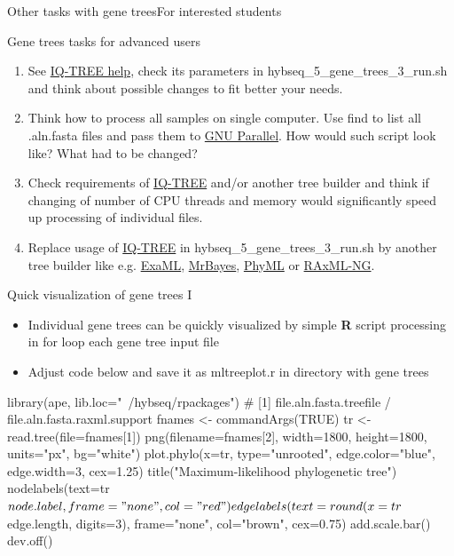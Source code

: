 \documentclass[compress,  xelatex, 11pt, xcolor=x11names, aspectratio=169,
	hyperref={
		bookmarks=true,
		unicode=true,
		colorlinks=true,
		pdftitle={HybSeq course},
		plainpages=false,
		pdfauthor={Vojtech Zeisek},
		pdfsubject={Practical processing of HybSeq target enrichment sequencing data on computing grids like MetaCentrum},
		pdfcreator={XeLaTeX},
		pdfkeywords={BASH, command line, GNU, HybSeq, Linux, MetaCentrum, sequencing shell, target enrichment},
		linkcolor=Turquoise4, %
		anchorcolor=DodgerBlue4, %
		citecolor=DodgerBlue4, %
		filecolor=DodgerBlue4, %
		menucolor=Tan4, %
		urlcolor=DarkOliveGreen4 %
		},
	url={hyphens, lowtilde} %
	]{beamer}
\renewcommand{\texttt}[1]{\colorbox{Cornsilk2}{{\ttfamily #1}}}
\begin{document}
\begin{frame}{Other tasks with gene trees}{For interested students}
	\begin{exampleblock}{Gene trees tasks for advanced users}
		\begin{enumerate}
			\item See \href{http://www.iqtree.org/doc/Command-Reference}{IQ-TREE help}, check its parameters in \texttt{hybseq\_5\_gene\_trees\_3\_run.sh} and think about possible changes to fit better your needs.
			\item Think how to process all samples on single computer. Use \texttt{find} to list all \texttt{*.aln.fasta} files and pass them to \href{https://www.gnu.org/software/parallel/}{GNU Parallel}. How would such script look like? What had to be changed?
			\item Check requirements of \href{http://www.iqtree.org/}{IQ-TREE} and/or another tree builder and think if changing of number of CPU threads and memory would significantly speed up processing of individual files.
			\item Replace usage of \href{http://www.iqtree.org/}{IQ-TREE} in \texttt{hybseq\_5\_gene\_trees\_3\_run.sh} by another tree builder like e.g. \href{https://github.com/stamatak/ExaML}{ExaML}, \href{https://nbisweden.github.io/MrBayes/}{MrBayes}, \href{https://github.com/stephaneguindon/phyml}{PhyML} or \href{https://github.com/amkozlov/raxml-ng}{RAxML-NG}.
		\end{enumerate}
	\end{exampleblock}
\end{frame}

\begin{frame}[fragile]{Quick visualization of gene trees I}
	\begin{itemize}
		\item Individual gene trees can be quickly visualized by simple \textbf{R} script processing in \texttt{for} loop each gene tree input file
		\item Adjust code below and save it as \texttt{mltreeplot.r} in directory  with gene trees
	\end{itemize}
	\begin{spluscode}
    library(ape, lib.loc="~/hybseq/rpackages")
    # [1] file.aln.fasta.treefile / file.aln.fasta.raxml.support
    fnames <- commandArgs(TRUE)
    tr <- read.tree(file=fnames[1])
    png(filename=fnames[2], width=1800, height=1800, units="px", bg="white")
      plot.phylo(x=tr, type="unrooted", edge.color="blue", edge.width=3,
        cex=1.25)
      title("Maximum-likelihood phylogenetic tree")
      nodelabels(text=tr$node.label, frame="none", col="red")
      edgelabels(text=round(x=tr$edge.length, digits=3), frame="none",
        col="brown", cex=0.75)
      add.scale.bar()
      dev.off()
	\end{spluscode}
\end{frame}
\end{document}
